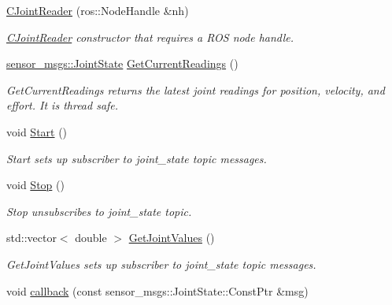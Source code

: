 \begin{DoxyCompactItemize}
\item 
\hyperlink{classCJointReader_a2cbebdbe7b42875b03bfb230af281fc8}{C\-Joint\-Reader} (ros\-::\-Node\-Handle \&nh)
\begin{DoxyCompactList}\small\item\em \hyperlink{classCJointReader}{C\-Joint\-Reader} constructor that requires a R\-O\-S node handle. \end{DoxyCompactList}\item 
\hyperlink{RCS_8h_aa4adb93a26caa4dacba9c9614e283245}{sensor\-\_\-msgs\-::\-Joint\-State} \hyperlink{classCJointReader_a53dbcee69928690650a9afd07b5ad314}{Get\-Current\-Readings} ()
\begin{DoxyCompactList}\small\item\em Get\-Current\-Readings returns the latest joint readings for position, velocity, and effort. It is thread safe. \end{DoxyCompactList}\item 
void \hyperlink{classCJointReader_a8a510635d4e6178b42c7e00bb4cf281e}{Start} ()
\begin{DoxyCompactList}\small\item\em Start sets up subscriber to joint\-\_\-state topic messages. \end{DoxyCompactList}\item 
void \hyperlink{classCJointReader_ae683e460046ed1614ec9570c7bcc5acf}{Stop} ()
\begin{DoxyCompactList}\small\item\em Stop unsubscribes to joint\-\_\-state topic. \end{DoxyCompactList}\item 
std\-::vector$<$ double $>$ \hyperlink{classCJointReader_a34d71748e190f04a8a2cc24d103fb084}{Get\-Joint\-Values} ()
\begin{DoxyCompactList}\small\item\em Get\-Joint\-Values sets up subscriber to joint\-\_\-state topic messages. \end{DoxyCompactList}\item 
void \hyperlink{classCJointReader_a88bd747fdc64aab2ce0843fdf1efc0af}{callback} (const sensor\-\_\-msgs\-::\-Joint\-State\-::\-Const\-Ptr \&msg)
\end{DoxyCompactItemize}
